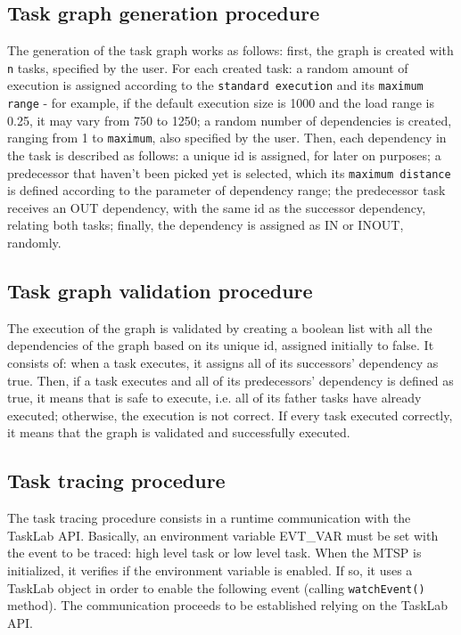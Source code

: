 \subsection{Task graph generation procedure}
The generation of the task graph works as follows: first, the graph is created with \texttt{n} tasks, specified by the user. For each created task: a random amount of execution is assigned according to the \texttt{standard execution} and its \texttt{maximum range} - for example, if the default execution size is 1000 and the load range is 0.25, it may vary from 750 to 1250; a random number of dependencies is created, ranging from 1 to \texttt{maximum}, also specified by the user.   Then, each dependency in the task is described as follows: a unique id is assigned, for later on purposes; a predecessor that haven't been picked yet is selected, which its \texttt{maximum distance} is defined according to the parameter of dependency range; the predecessor task receives an OUT dependency, with the same id as the successor dependency, relating both tasks; finally, the dependency is assigned as IN or INOUT, randomly. 

\subsection{Task graph validation procedure}
The execution of the graph is validated by creating a boolean list with all the dependencies of the graph based on its unique id, assigned initially to false. It consists of: when a task executes, it assigns all of its successors' dependency as true. Then, if a task executes and all of its predecessors' dependency is defined as true, it means that is safe to execute, i.e. all of its father tasks have already executed; otherwise, the execution is not correct. If every task executed correctly, it means that the graph is validated and successfully executed.

\subsection{Task tracing procedure}
The task tracing procedure consists in a runtime communication with the TaskLab API. Basically, an environment variable EVT\_VAR must be set with the event to be traced: high level task or low level task. When the MTSP is initialized, it verifies if the environment variable is enabled. If so, it uses a TaskLab object in order to enable the following event (calling \texttt{watchEvent()} method). The communication proceeds to be established relying on the TaskLab API. 


